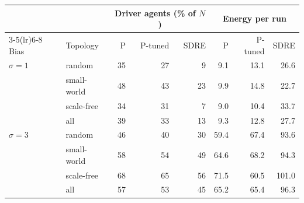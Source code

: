 \begin{tabular}{llrrrrrr}
\toprule
 & & \multicolumn{3}{c}{Driver agents (\% of $N$)} & \multicolumn{3}{c}{Energy per run} \\
\cmidrule(lr){3-5}\cmidrule(lr){6-8}
Bias & Topology & P & P-tuned & SDRE & P & P-tuned & SDRE \\
\midrule
$\sigma=1$ & random & 35 & 27 & 9 & 9.1 & 13.1 & 26.6 \\
 & small-world & 48 & 43 & 23 & 9.9 & 14.8 & 22.7 \\
 & scale-free & 34 & 31 & 7 & 9.0 & 10.4 & 33.7 \\
 & all & 39 & 33 & 13 & 9.3 & 12.8 & 27.7 \\
\addlinespace
$\sigma=3$ & random & 46 & 40 & 30 & 59.4 & 67.4 & 93.6 \\
 & small-world & 58 & 54 & 49 & 64.6 & 68.2 & 94.3 \\
 & scale-free & 68 & 65 & 56 & 71.5 & 60.5 & 101.0 \\
 & all & 57 & 53 & 45 & 65.2 & 65.4 & 96.3 \\
\bottomrule
\end{tabular}
